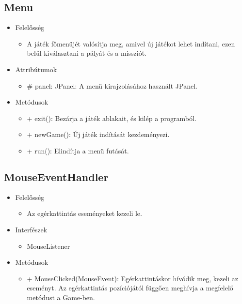 \subsection{Menu}
\begin{itemize}
\item Felelősség
\begin{itemize}
	\item A játék főmenüjét valósítja meg, amivel új játékot lehet indítani, ezen belül kiválasztani a pályát és a missziót.
\end{itemize}
\item Attribútumok
	\begin{itemize}
		\item \# panel: JPanel: A menü kirajzolásához használt JPanel.
	\end{itemize}
\item Metódusok
	\begin{itemize}
		\item + exit(): Bezárja a játék ablakait, és kilép a programból.
		\item + newGame(): Új játék indítását kezdeményezi.
		\item + run(): Elindítja a menü futását.
	\end{itemize}
\end{itemize}

\subsection{MouseEventHandler}
\begin{itemize}
\item Felelősség
\begin{itemize}
	\item Az egérkattintás eseményeket kezeli le.
\end{itemize}
\item Interfészek
\begin{itemize}
	\item MouseListener
\end{itemize}
\item Metódusok
	\begin{itemize}
		\item + MouseClicked(MouseEvent): Egérkattintáskor hívódik meg, kezeli az eseményt. Az egérkattintás pozíciójától függően meghívja a megfelelő metódust a Game-ben.
	\end{itemize}
\end{itemize}

